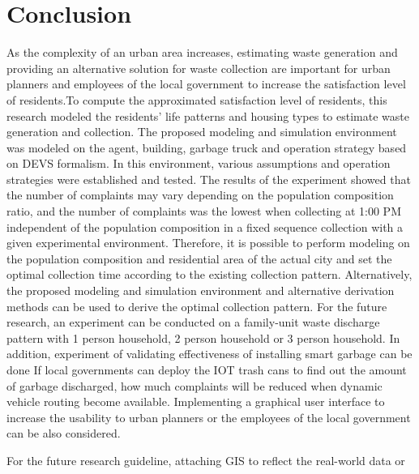 \documentclass{scsSimAUDPaperFormat}
\begin{document}
\section{Conclusion}

As the complexity of an urban area increases, estimating waste generation and providing an alternative solution for waste collection are important for urban planners and employees of the local government to increase the satisfaction level of residents.To compute the approximated satisfaction level of residents, this research modeled the residents' life patterns and housing types to estimate waste generation and collection. The proposed modeling and simulation environment was modeled on the agent, building, garbage truck and operation strategy based on DEVS formalism. In this environment, various assumptions and operation strategies were established and tested. The results of the experiment showed that the number of complaints may vary depending on the population composition ratio, and the number of complaints was the lowest when collecting at 1:00 PM independent of the population composition in a fixed sequence collection with a given experimental environment. Therefore, it is possible to perform modeling on the population composition and residential area of the actual city and set the optimal collection time according to the existing collection pattern. Alternatively, the proposed modeling and simulation environment and alternative derivation methods can be used to derive the optimal collection pattern. For the future research, an experiment can be conducted on a family-unit waste discharge pattern with 1 person household, 2 person household or 3 person household. In addition, experiment of validating effectiveness of installing smart garbage can be done  If local governments can deploy the IOT trash cans to find out the amount of garbage discharged, how much complaints will be reduced when dynamic vehicle routing become available. Implementing a graphical user interface to increase the usability to urban planners or the employees of the local government can be also considered.


For the future research guideline, attaching GIS to reflect the real-world data or 



\balance



\end{document}
